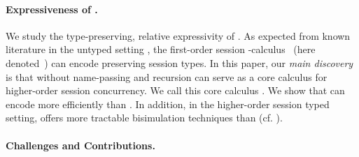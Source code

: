 \documentclass[runningheads]{llncs}
\begin{document}
\paragraph{Expressiveness of \HOp.}
We study the type-preserving, 
relative expressivity of \HOp. %
As expected from 
known literature in the untyped setting \cite{SangiorgiD:expmpa}, 
the first-order session \sessp-calculus~\cite{honda.vasconcelos.kubo:language-primitives} {(here denoted~\sessp)} 
can encode  
\HOp preserving session types. 
In this paper, 
our \emph{main discovery} is 
that 
\HOp 
without
name-passing and recursion
can serve as a 
core calculus    
for higher-order session concurrency.  
We call this core calculus \HO. 
We show that \HO can encode \HOp more efficiently 
than \sessp. In addition, in the higher-order session typed setting, 
\HO offers more tractable bisimulation techniques 
than \sessp (cf. ).



\paragraph{Challenges and Contributions.}
\end{document}

